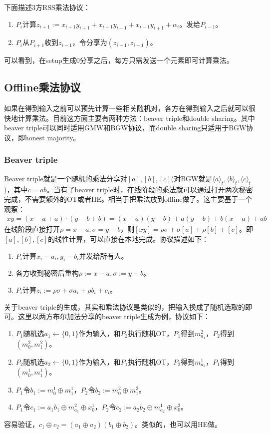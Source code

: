 \documentclass[UTF8]{ctexart}
\theoremstyle{nonumberplain}
\theoremstyle{plain}
\begin{document}
下面描述3方RSS乘法协议：
\begin{enumerate}
\item $P_i$计算$z_{i+1}:=x_{i+1}y_{i+1}+x_{i+1}y_{i-1}+x_{i-1}y_{i+1}+\alpha_i$。发给$P_{i-1}$。
\item $P_i$从$P_{i+1}$收到$z_{i-1}$，令分享为$(z_{i-1},z_{i+1})$。
\end{enumerate}
可以看到，在setup生成0分享之后，每方只需发送一个元素即可计算乘法。
\subsection{Offline乘法协议}
如果在得到输入之前可以预先计算一些相关随机对，各方在得到输入之后就可以很快地计算乘法。目前这方面主要有两种方法：beaver triple和double sharing。其中beaver triple可以同时适用GMW和BGW协议，而double sharing只适用于BGW协议，即honest majority。
\subsubsection{Beaver triple}
Beaver triple\cite{DBLP:conf/crypto/Beaver91a}就是一个随机的乘法分享对$[a],[b],[c]$(对BGW就是$\langle a\rangle_t,\langle b\rangle_t,\langle c\rangle_t$)，其中$c=ab$。当有了beaver triple时，在线阶段的乘法就可以通过打开两次秘密完成，不需要额外的OT或者HE。相当于把乘法放到offline做了。这主要基于一个观察：
\begin{align*}
xy=(x-a+a)\cdot(y-b+b)=(x-a)(y-b)+a(y-b)+b(x-a)+ab
\end{align*}
在线阶段直接打开$\rho = x-a,\sigma=y-b$，则$[xy]=\rho\sigma+\sigma[a]+\rho[b]+[c]$。即$[a],[b],[c]$的线性计算，可以直接在本地完成。协议描述如下：
\begin{enumerate}
\item $P_i$计算$x_i-a_i,y_i-b_i$并发给所有人。
\item 各方收到秘密后重构$\rho:=x-a,\sigma:=y-b$。
\item $P_i$计算$z_i:=\rho\sigma+\sigma a_i+\rho b_i+c_i$。
\end{enumerate}

关于beaver triple的生成，其实和乘法协议是类似的，把输入换成了随机选取的即可。这里以两方布尔加法分享的beaver triple生成为例，协议如下：

\begin{enumerate}
\item $P_1$随机选$a_1\leftarrow \{0,1\}$作为输入，和$P_2$执行随机OT，$P_1$得到$m^2_{a_1}$，$P_2$得到$(m^2_0,m^2_1)$。
\item $P_2$随机选$a_2\leftarrow \{0,1\}$作为输入，和$P_1$执行随机OT，$P_2$得到$m^1_{a_2}$，$P_1$得到$(m^1_0,m^1_1)$。
\item $P_1$令$b_1:=m^1_0\oplus m^1_1$，$P_2$令$b_2:=m^2_0\oplus m^2_1$。
\item $P_1$令$c_1:=a_1b_1\oplus m^2_{a_1}\oplus x_0^1$，$P_2$令$c_2:=a_2b_2\oplus m^1_{a_2}\oplus x_0^2$。
\end{enumerate}
容易验证，$c_1\oplus c_2 = (a_1\oplus a_2)(b_1\oplus b_2)$。类似的，也可以用HE做。
\end{document}
